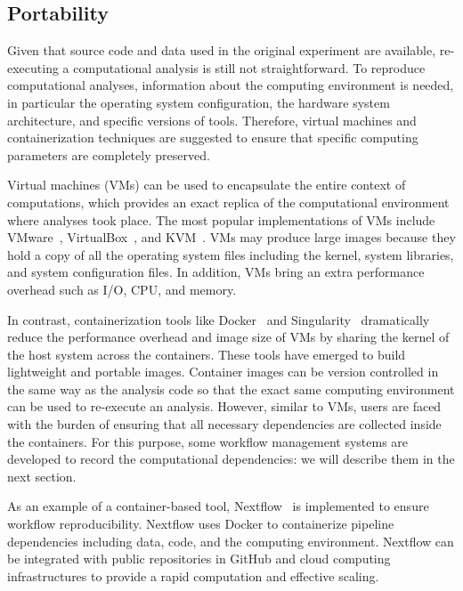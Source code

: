 \subsection{Portability}

Given that source code and data used in the original experiment are 
available, re-executing a computational analysis is still not 
straightforward. To reproduce computational analyses, information about the
computing environment is needed, in particular the operating system 
configuration, the hardware system architecture, and specific versions of 
tools. Therefore, virtual machines and containerization techniques are 
suggested to ensure that specific computing parameters are completely 
preserved. 

Virtual machines (VMs) can be used to encapsulate the entire context of 
computations, which provides an exact replica of the computational 
environment where analyses took place. The most popular implementations 
of VMs include VMware~\cite{wiki:vmware}, 
VirtualBox~\cite{watson2008virtualbox}, and KVM~\cite{kivity2007kvm}. 
VMs may produce large images because they hold a copy of all the 
operating system files including the kernel, system libraries, and system 
configuration files. In addition, VMs bring an extra 
performance overhead such as I/O, CPU, and memory.

In contrast, containerization tools like 
Docker~\cite{boettiger2015introduction} and 
Singularity~\cite{kurtzer2017singularity} dramatically reduce the 
performance overhead and image size of VMs by sharing the kernel of the 
host system across the containers. These tools have emerged to build 
lightweight and portable images. Container images can be version 
controlled in the same way as the analysis code so that the exact same 
computing environment can be used to re-execute an analysis. However, 
similar to VMs, users are faced with the burden of ensuring that all 
necessary dependencies are collected inside the containers. For this 
purpose, some workflow management systems are developed to record the 
computational dependencies: we will describe them in the next section. 

As an example of a container-based tool, Nextflow~\cite{di2017nextflow} 
is implemented to ensure workflow reproducibility. Nextflow uses Docker 
to containerize pipeline dependencies including data, code, and the 
computing environment. Nextflow can be integrated with public 
repositories in GitHub and cloud computing infrastructures to provide a 
rapid computation and effective scaling. 

